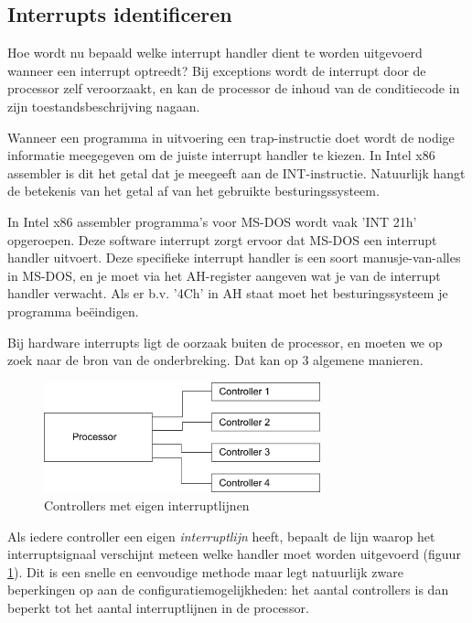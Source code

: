 \subsection{Interrupts identificeren}

Hoe wordt nu bepaald welke interrupt handler dient te worden
uitgevoerd wanneer een interrupt optreedt? Bij exceptions wordt de
interrupt door de processor zelf veroorzaakt, en kan de processor de
inhoud van de conditiecode in zijn toestandsbeschrijving
nagaan.

Wanneer een programma in uitvoering een trap-instructie doet
wordt de nodige informatie meegegeven om de juiste interrupt handler
te kiezen. In Intel x86 assembler is dit het getal dat je meegeeft aan de
INT-instructie. Natuurlijk hangt de betekenis van het getal af van het
gebruikte besturingssysteem.

In Intel x86 assembler programma's voor MS-DOS wordt vaak 'INT 21h'
opgeroepen. Deze software interrupt zorgt ervoor dat MS-DOS een
interrupt handler uitvoert. Deze specifieke interrupt handler is een
soort manusje-van-alles in MS-DOS, en je moet via het AH-register
aangeven wat je van de interrupt handler verwacht. Als er b.v. '4Ch'
in AH staat moet het besturingssysteem je programma be\"eindigen.

Bij hardware interrupts ligt de oorzaak buiten de processor, en
moeten we op zoek naar de bron van de onderbreking. Dat kan op 3
algemene manieren.

\begin{figure}
\begin{center}
\includegraphics[width=80mm]{images/fig0203.png}
\end{center}
\caption{Controllers met eigen interruptlijnen}
\label{eigenlijn}
\end{figure}

Als iedere controller een eigen
\emph{interruptlijn} heeft, bepaalt de lijn waarop het
interruptsignaal verschijnt meteen welke handler moet worden
uitgevoerd (figuur \ref{eigenlijn}). Dit is een snelle en eenvoudige methode
maar legt
natuurlijk zware beperkingen op aan de configuratiemogelijkheden: het
aantal controllers is dan beperkt tot het aantal interruptlijnen in de
processor.

